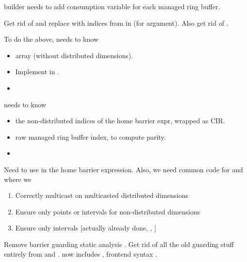  builder needs to add consumption variable for each managed ring buffer.


Get rid of  and replace with indices from  in  (for  argument).
Also get rid of .

To do the above,  needs to know
\begin{itemize}
  \item array  (without distributed dimensions).
  \item Implement  in .
  \item {}
\end{itemize}
 needs to know
\begin{itemize}
  \item the non-distributed indices of the home barrier expr, wrapped as CIR.
  \item raw managed ring buffer index, to compute parity.
  \item {}
\end{itemize}
Need to use  in the home barrier expression.
Also, we need common code for  and  where we
\begin{enumerate}
  \item Correctly multicast on multicasted distributed dimensions
  \item Ensure only points or  intervals for non-distributed dimensions
  \item Ensure only  intervals [actually already done, , ]
\end{enumerate}




Remove barrier guarding static analysis .
Get rid of all the old guarding stuff entirely from  and .
 now includes , frontend syntax .

